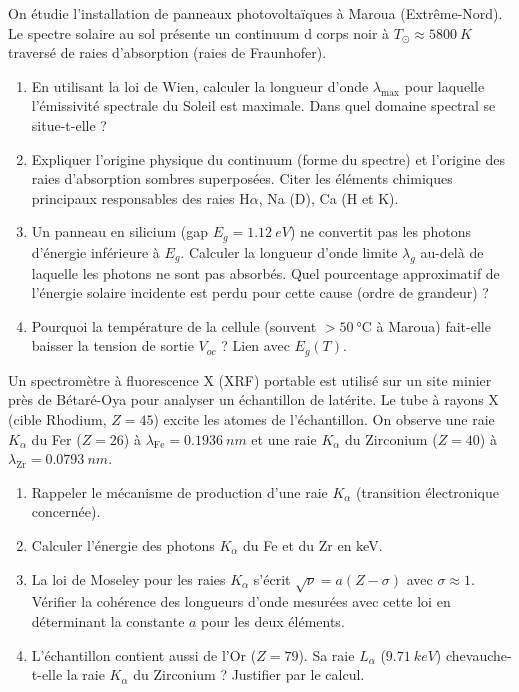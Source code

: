 \documentclass[11pt]{article}
\begin{document}
\begin{exercice}
On étudie l'installation de panneaux photovoltaïques à Maroua (Extrême-Nord). Le spectre solaire au sol présente un continuum d corps noir à $T_{\odot} \approx \SI{5800}{K}$ traversé de raies d'absorption (raies de Fraunhofer).
\begin{enumerate}
    \item En utilisant la loi de Wien, calculer la longueur d'onde $\lambda_{\text{max}}$ pour laquelle l'émissivité spectrale du Soleil est maximale. Dans quel domaine spectral se situe-t-elle ?
    \item Expliquer l'origine physique du continuum (forme du spectre) et l'origine des raies d'absorption sombres superposées. Citer les éléments chimiques principaux responsables des raies H$\alpha$, Na (D), Ca (H et K).
    \item Un panneau en silicium (gap $E_g = \SI{1,12}{eV}$) ne convertit pas les photons d'énergie inférieure à $E_g$. Calculer la longueur d'onde limite $\lambda_g$ au-delà de laquelle les photons ne sont pas absorbés. Quel pourcentage approximatif de l'énergie solaire incidente est perdu pour cette cause (ordre de grandeur) ?
    \item Pourquoi la température de la cellule (souvent $> \SI{50}{\celsius}$ à Maroua) fait-elle baisser la tension de sortie $V_{oc}$ ? Lien avec $E_g(T)$.
\end{enumerate}
\end{exercice}

\begin{exercice}
Un spectromètre à fluorescence X (XRF) portable est utilisé sur un site minier près de Bétaré-Oya pour analyser un échantillon de latérite. Le tube à rayons X (cible Rhodium, $Z=45$) excite les atomes de l'échantillon. On observe une raie $K_{\alpha}$ du Fer ($Z=26$) à $\lambda_{\text{Fe}} = \SI{0,1936}{nm}$ et une raie $K_{\alpha}$ du Zirconium ($Z=40$) à $\lambda_{\text{Zr}} = \SI{0,0793}{nm}$.
\begin{enumerate}
    \item Rappeler le mécanisme de production d'une raie $K_{\alpha}$ (transition électronique concernée).
    \item Calculer l'énergie des photons $K_{\alpha}$ du Fe et du Zr en keV.
    \item La loi de Moseley pour les raies $K_{\alpha}$ s'écrit $\sqrt{\nu} = a (Z - \sigma)$ avec $\sigma \approx 1$. Vérifier la cohérence des longueurs d'onde mesurées avec cette loi en déterminant la constante $a$ pour les deux éléments.
    \item L'échantillon contient aussi de l'Or ($Z=79$). Sa raie $L_{\alpha}$ ($\SI{9,71}{keV}$) chevauche-t-elle la raie $K_{\alpha}$ du Zirconium ? Justifier par le calcul.
\end{enumerate}
\end{exercice}
\end{document}
